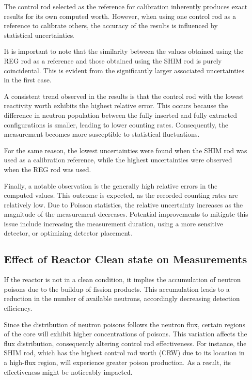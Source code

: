 The control rod selected as the reference for calibration inherently produces exact results for its own computed worth. However, when using one control rod as a reference to calibrate others, the accuracy of the results is influenced by statistical uncertainties.

It is important to note that the similarity between the values obtained using the REG rod as a reference and those obtained using the SHIM rod is purely coincidental. This is evident from the significantly larger associated uncertainties in the first case.

A consistent trend observed in the results is that the control rod with the lowest reactivity worth exhibits the highest relative error. This occurs because the difference in neutron population between the fully inserted and fully extracted configurations is smaller, leading to lower counting rates. Consequently, the measurement becomes more susceptible to statistical fluctuations.

For the same reason, the lowest uncertainties were found when the SHIM rod was used as a calibration reference, while the highest uncertainties were observed when the REG rod was used.

Finally, a notable observation is the generally high relative errors in the computed values. This outcome is expected, as the recorded counting rates are relatively low. Due to Poisson statistics, the relative uncertainty increases as the magnitude of the measurement decreases. Potential improvements to mitigate this issue include increasing the measurement duration, using a more sensitive detector, or optimizing detector placement.


\subsection{Effect of Reactor Clean state on Measurements}

If the reactor is not in a clean condition, it implies the accumulation of neutron poisons due to the buildup of fission products. This accumulation leads to a reduction in the number of available neutrons, accordingly decreasing detection efficiency.

Since the distribution of neutron poisons follows the neutron flux, certain regions of the core will exhibit higher concentrations of poisons. This variation affects the flux distribution, consequently altering control rod effectiveness. For instance, the SHIM rod, which has the highest control rod worth (CRW) due to its location in a high-flux region, will experience greater poison production. As a result, its effectiveness might be noticeably impacted.

